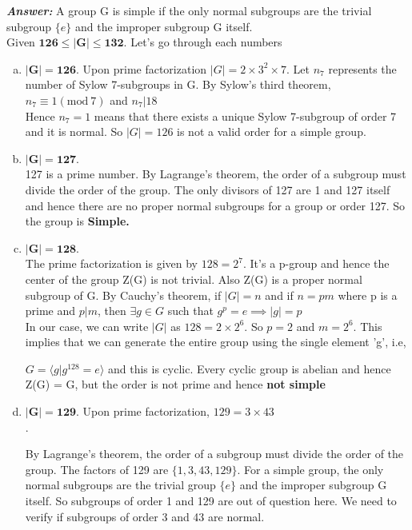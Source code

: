 \documentclass[11pt,a4paper]{article}
\begin{document}
	\begin{flushleft}
		\textbf{\textit{Answer:}}
		A group G is simple if the only normal subgroups are the trivial subgroup $\{e\}$ and the improper subgroup G itself.\\
		\medskip
		Given $\mathbf{126 \le |G| \le 132}$. Let's go through each numbers
		\begin{enumerate}[(a)]
			\item $\mathbf{|G| = 126}$.
			Upon prime factorization $|G| = 2\times3^2\times7$. Let $n_7$ represents the number of Sylow 7-subgroups in G. By Sylow's third theorem,\medskip \\             
			$n_7 \equiv 1(\textrm{mod}\ 7)$ and $n_7|18$\smallskip\\
			Hence $n_7 = 1$ means that there exists a unique Sylow 7-subgroup of order 7 and it is normal. So $|G|=126$ is not a valid order for a simple group.
			
			\item $\mathbf{|G| = 127}$.\\
			127 is a prime number. By Lagrange's theorem, the order of a subgroup must divide the order of the group. The only divisors of 127 are 1 and 127 itself and hence there are no proper normal subgroups for a group or order 127. So the group is \textbf{Simple.}
			
			\item $\mathbf{|G| = 128}$. \\
			The prime factorization is given by $128 = 2^7$. It's a p-group and hence the center of the group Z(G) is not trivial. Also Z(G) is a proper normal subgroup of G. By Cauchy's theorem, if $|G| = n$ and if $n = pm$ where p is a prime and $p|m$, then $\exists g \in G$ such that $g^p = e \implies |g| = p$\medskip\\
			
			In  our case, we can write $|G|$ as $128 = 2\times2^6$. So $p = 2$ and $m = 2^6$. This implies that we can generate the entire group using the single element 'g', i.e, 
			
			$G = \langle g | g^{128}=e\rangle$ and this is cyclic. Every cyclic group is abelian and hence Z(G) = G, but the order is not prime and hence \textbf{not simple}
			
			\item $\mathbf{|G| = 129}$. Upon prime factorization, $129 = 3\times43$\\. 
			
			By Lagrange's theorem, the order of a subgroup must divide the order of the group. The factors of 129 are $\{1, 3, 43, 129\}$. For a simple group, the only normal subgroups are the trivial group $\{e\}$ and the improper subgroup G itself. So subgroups of order 1 and 129 are out of question here. We need to verify if subgroups of order 3 and 43 are normal.\medskip\\
			

\end{enumerate}
\end{flushleft}
\end{document}
